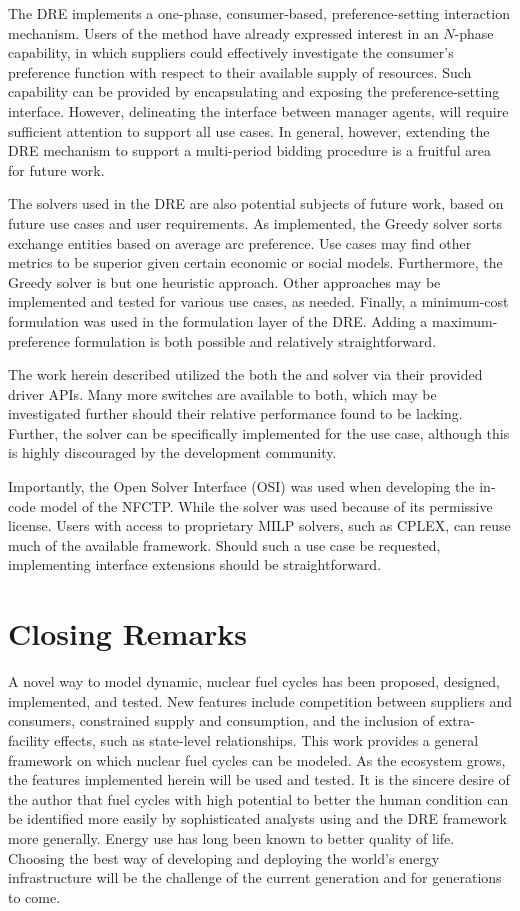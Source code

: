 The DRE implements a one-phase, consumer-based, preference-setting interaction
mechanism. Users of the method have already expressed interest in an $N$-phase
capability, in which suppliers could effectively investigate the consumer's
preference function with respect to their available supply of resources. Such
capability can be provided by encapsulating and exposing the preference-setting
interface. However, delineating the interface between manager agents, will
require sufficient attention to support all use cases. In general, however,
extending the DRE mechanism to support a multi-period bidding procedure is a
fruitful area for future work.

The solvers used in the DRE are also potential subjects of future work, based on
future use cases and user requirements. As implemented, the Greedy solver sorts
exchange entities based on average arc preference. Use cases may find other
metrics to be superior given certain economic or social models. Furthermore, the
Greedy solver is but one heuristic approach. Other approaches may be implemented
and tested for various use cases, as needed. Finally, a minimum-cost formulation
was used in the formulation layer of the DRE. Adding a maximum-preference
formulation is both possible and relatively straightforward. 

The work herein described utilized the both the \cbc and \clp solver via their
provided driver APIs. Many more switches are available to both, which may be
investigated further should their relative performance found to be
lacking. Further, the \cbc solver can be specifically implemented for the \Cyclus
use case, although this is highly discouraged by the \cbc development community. 

Importantly, the Open Solver Interface (OSI) was used when developing the
in-code model of the NFCTP. While the \cbc solver was used because of its
permissive license. Users with access to proprietary MILP solvers, such as
CPLEX, can reuse much of the available framework. Should such a use case be
requested, implementing interface extensions should be straightforward.

\section{Closing Remarks}

A novel way to model dynamic, nuclear fuel cycles has been proposed, designed,
implemented, and tested. New features include competition between suppliers and
consumers, constrained supply and consumption, and the inclusion of
extra-facility effects, such as state-level relationships. This work provides a
general framework on which nuclear fuel cycles can be modeled. As the \Cyclus
ecosystem grows, the features implemented herein will be used and tested. It is
the sincere desire of the author that fuel cycles with high potential to better
the human condition can be identified more easily by sophisticated analysts
using \Cyclus and the DRE framework more generally. Energy use has long been
known to better quality of life. Choosing the best way of developing and
deploying the world's energy infrastructure will be the challenge of the current
generation and for generations to come.

